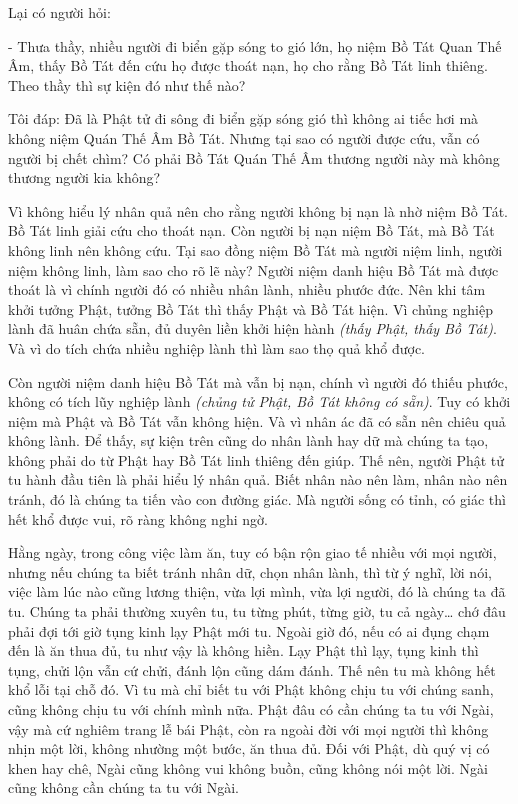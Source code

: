\documentclass[
  12pt,
  oneside]{book}
\begin{document}
Lại có người hỏi:

- Thưa thầy, nhiều người đi biển gặp sóng to gió lớn, họ niệm Bồ Tát Quan Thế Âm, thấy Bồ Tát đến cứu họ được thoát nạn, họ cho rằng Bồ Tát linh thiêng. Theo thầy thì sự kiện đó như thế nào?

Tôi đáp: Đã là Phật tử đi sông đi biển gặp sóng gió thì không ai tiếc hơi mà không niệm Quán Thế Âm Bồ Tát. Nhưng tại sao có người được cứu, vẫn có người bị chết chìm? Có phải Bồ Tát Quán Thế Âm thương người này mà không thương người kia không?

Vì không hiểu lý nhân quả nên cho rằng người không bị nạn là nhờ niệm Bồ Tát. Bồ Tát linh giải cứu cho thoát nạn. Còn người bị nạn niệm Bồ Tát, mà Bồ Tát không linh nên không cứu. Tại sao đồng niệm Bồ Tát mà người niệm linh, người niệm không linh, làm sao cho rõ lẽ này? Người niệm danh hiệu Bồ Tát mà được thoát là vì chính người đó có nhiều nhân lành, nhiều phước đức. Nên khi tâm khởi tưởng Phật, tưởng Bồ Tát thì thấy Phật và Bồ Tát hiện. Vì chủng nghiệp lành đã huân chứa sẵn, đủ duyên liền khởi hiện hành \emph{(thấy Phật, thấy Bồ Tát)}. Và vì do tích chứa nhiều nghiệp lành thì làm sao thọ quả khổ được.

Còn người niệm danh hiệu Bồ Tát mà vẫn bị nạn, chính vì người đó thiếu phước, không có tích lũy nghiệp lành \emph{(chủng tử Phật, Bồ Tát không có sẵn)}. Tuy có khởi niệm mà Phật và Bồ Tát vẫn không hiện. Và vì nhân ác đã có sẵn nên chiêu quả không lành. Để thấy, sự kiện trên cũng do nhân lành hay dữ mà chúng ta tạo, không phải do từ Phật hay Bồ Tát linh thiêng đến giúp. Thế nên, người Phật tử tu hành đầu tiên là phải hiểu lý nhân quả. Biết nhân nào nên làm, nhân nào nên tránh, đó là chúng ta tiến vào con đường giác. Mà người sống có tỉnh, có giác thì hết khổ được vui, rõ ràng không nghi ngờ.

Hằng ngày, trong công việc làm ăn, tuy có bận rộn giao tế nhiều với mọi người, nhưng nếu chúng ta biết tránh nhân dữ, chọn nhân lành, thì từ ý nghĩ, lời nói, việc làm lúc nào cũng lương thiện, vừa lợi mình, vừa lợi người, đó là chúng ta đã tu. Chúng ta phải thường xuyên tu, tu từng phút, từng giờ, tu cả ngày\ldots{} chớ đâu phải đợi tới giờ tụng kinh lạy Phật mới tu. Ngoài giờ đó, nếu có ai đụng chạm đến là ăn thua đủ, tu như vậy là không hiền. Lạy Phật thì lạy, tụng kinh thì tụng, chửi lộn vẫn cứ chửi, đánh lộn cũng dám đánh. Thế nên tu mà không hết khổ lỗi tại chỗ đó. Vì tu mà chỉ biết tu với Phật không chịu tu với chúng sanh, cũng không chịu tu với chính mình nữa. Phật đâu có cần chúng ta tu với Ngài, vậy mà cứ nghiêm trang lễ bái Phật, còn ra ngoài đời với mọi người thì không nhịn một lời, không nhường một bước, ăn thua đủ. Đối với Phật, dù quý vị có khen hay chê, Ngài cũng không vui không buồn, cũng không nói một lời. Ngài cũng không cần chúng ta tu với Ngài.
\end{document}
